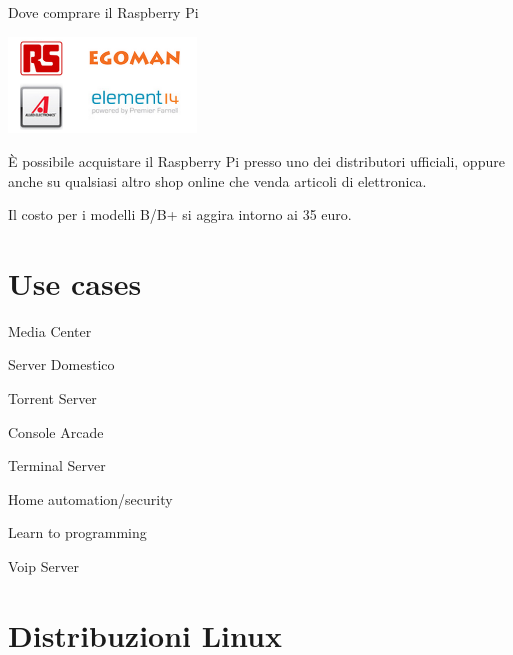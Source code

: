 \documentclass[xcolor=svgnames,11pt]{beamer}
\begin{document}
\begin{frame}{Dove comprare il Raspberry Pi}

\begin{center}
\includegraphics[width=5cm]{wherebuy.png}
\end{center}

\`E possibile acquistare il Raspberry Pi presso uno dei distributori ufficiali, oppure anche su qualsiasi altro shop online che venda articoli di elettronica.

\medskip

Il costo per i modelli B/B+ si aggira intorno ai 35 euro.

\end{frame}

\section{Use cases}

\begin{frame}{Media Center}
\end{frame}

\begin{frame}{Server Domestico}
\end{frame}

\begin{frame}{Torrent Server}
\end{frame}

\begin{frame}{Console Arcade}
\end{frame}

\begin{frame}{Terminal Server}
\end{frame}

\begin{frame}{Home automation/security}
\end{frame}

\begin{frame}{Learn to programming}
\end{frame}

\begin{frame}{Voip Server}
\end{frame}

\section{Distribuzioni Linux}
\end{document}
